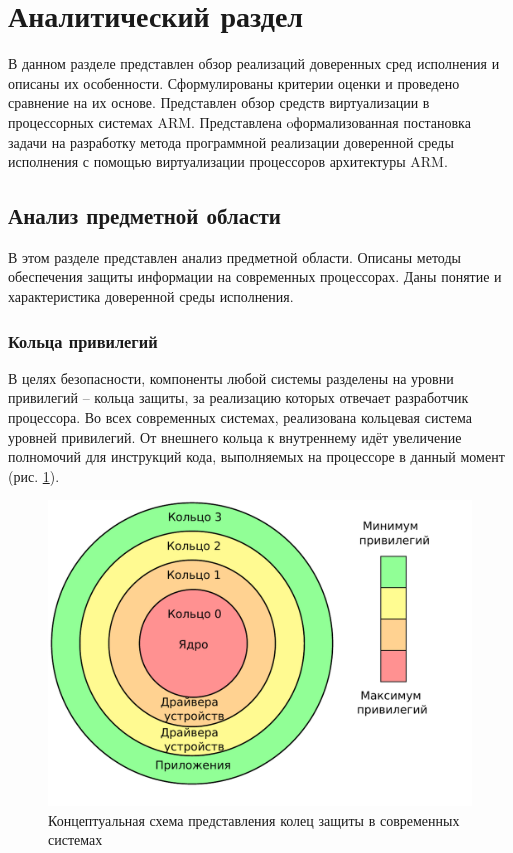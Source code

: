 \section{Аналитический раздел}

В данном разделе представлен обзор реализаций доверенных сред исполнения и описаны их особенности. Сформулированы критерии оценки и проведено сравнение на их основе. Представлен обзор средств виртуализации в процессорных системах ARM. Представлена oформализованная постановка задачи на разработку метода программной реализации доверенной среды исполнения с помощью виртуализации процессоров архитектуры ARM.

\subsection{Анализ предметной области}

В этом разделе представлен анализ предметной области. Описаны методы обеспечения защиты информации на современных процессорах. Даны понятие и характеристика доверенной среды исполнения.

\subsubsection{Кольца привилегий}

В целях безопасности, компоненты любой системы разделены на уровни привилегий -- кольца защиты, за реализацию которых отвечает разработчик процессора. Во всех современных системах, реализована кольцевая система уровней привилегий. От внешнего кольца к внутреннему идёт увеличение полномочий для инструкций кода, выполняемых на процессоре в данный момент (рис. \ref{fig:rings}).

\begin{figure}[h]
	\centering
	\includegraphics[width=\textwidth]{img/rings.pdf}
	\caption{Концептуальная схема представления колец защиты в современных системах}
	\label{fig:rings}
\end{figure}

